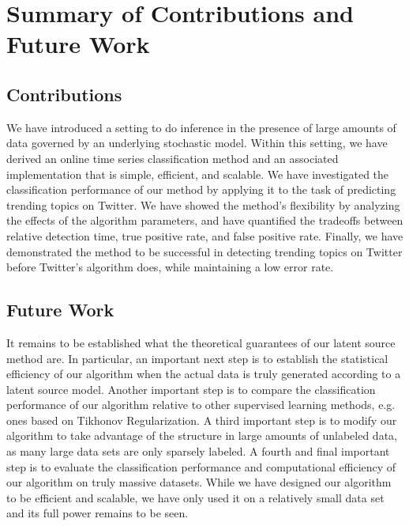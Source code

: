 \chapter{Summary of Contributions and Future Work}
\label{ch:conclusion}

\section{Contributions}
We have introduced a setting to do inference in the presence of large amounts of
data governed by an underlying stochastic model. Within this setting, we have
derived an online time series classification method and an associated
implementation that is simple, efficient, and scalable. We have investigated the
classification performance of our method by applying it to the task of
predicting trending topics on Twitter. We have showed the method's flexibility
by analyzing the effects of the algorithm parameters, and have quantified the
tradeoffs between relative detection time, true positive rate, and false
positive rate. Finally, we have demonstrated the method to be successful in
detecting trending topics on Twitter before Twitter's algorithm does, while
maintaining a low error rate.

\section{Future Work}
It remains to be established what the theoretical guarantees of our latent
source method are. In particular, an important next step is to establish the
statistical efficiency of our algorithm when the actual data is truly generated
according to a latent source model. Another important step is to compare the
classification performance of our algorithm relative to other supervised
learning methods, e.g. ones based on Tikhonov Regularization. A third important
step is to modify our algorithm to take advantage of the structure in large
amounts of unlabeled data, as many large data sets are only sparsely labeled. A
fourth and final important step is to evaluate the classification performance
and computational efficiency of our algorithm on truly massive datasets. While
we have designed our algorithm to be efficient and scalable, we have only used
it on a relatively small data set and its full power remains to be seen.
